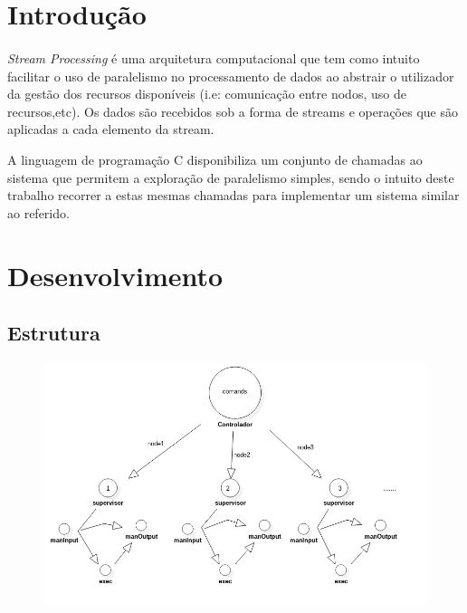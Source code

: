 \documentclass[12pt]{article}
\begin{document}
\section{Introdução}
\paragraph{}
\textit{Stream Processing} é uma arquitetura computacional que tem como intuito facilitar o uso de paralelismo no processamento de dados ao abstrair o utilizador da gestão dos recursos disponíveis (i.e: comunicação entre nodos, uso de recursos,etc). Os dados são recebidos sob a forma de streams e operações que são aplicadas a cada elemento da stream. 

A linguagem de programação C disponibiliza um conjunto de chamadas ao sistema que permitem a exploração de paralelismo simples, sendo o intuito deste trabalho recorrer a estas mesmas chamadas para implementar um sistema similar ao referido.


\newpage


\section{Desenvolvimento} 

\subsection{Estrutura}
\begin{figure}[ht!]
\centering
\includegraphics[width=120mm]{graph.jpg}
\end{figure}
\end{document}

